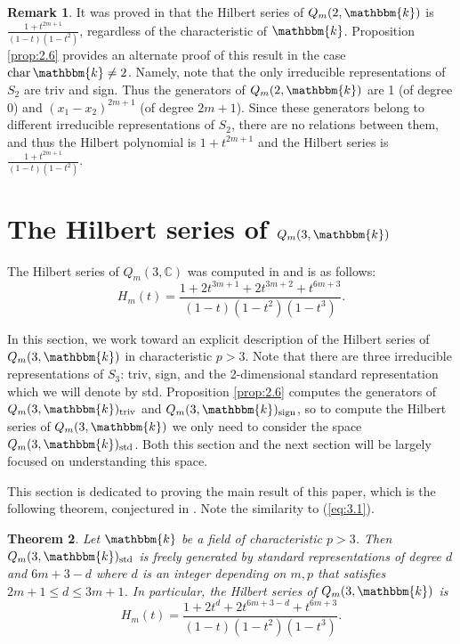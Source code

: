 \documentclass[11pt]{article}
\newtheorem{theorem}{Theorem}[section]
\theoremstyle{definition}
\newtheorem{remark}[theorem]{Remark}
\renewcommand{\k}{\mathbbm{k}}
\newcommand{\triv}{\mathrm{triv}}
\newcommand{\std}{\mathrm{std}}
\newcommand{\sgn}{\mathrm{sign}}
\renewcommand{\char}{\text{char\,}}
\newcommand{\C}{\mathbb{C}}
\begin{document}
\begin{remark}\label{rem:2.7}
    It was proved in \cite{Ren_2020} that the Hilbert series of $Q_m(2,\k)$ is $\frac{1+t^{2m+1}}{(1-t)(1-t^2)}$, regardless of the characteristic of $\k$. Proposition \ref{prop:2.6} provides an alternate proof of this result in the case $\char \k\neq 2$. Namely, note that the only irreducible representations of $S_2$ are triv and sign. Thus the generators of $Q_m(2,\k)$ are 1 (of degree 0) and $(x_1-x_2)^{2m+1}$ (of degree $2m+1$). Since these generators belong to different irreducible representations of $S_2$, there are no relations between them, and thus the Hilbert polynomial is $1+t^{2m+1}$ and the Hilbert series is $\frac{1+t^{2m+1}}{(1-t)(1-t^2)}$.
\end{remark}

\section{The Hilbert series of $Q_m(3,\k)$}\label{sec:3}

The Hilbert series of $Q_m(3,\C)$ was computed in \cite{felder2003action} and is as follows:
\begin{equation}\label{eq:3.1}
    H_m(t)=\frac{1+2t^{3m+1}+2t^{3m+2}+t^{6m+3}}{(1-t)(1-t^2)(1-t^3)}.\tag{3.1}
\end{equation}

In this section, we work toward an explicit description of the Hilbert series of $Q_m(3,\k)$ in characteristic $p>3$. Note that there are three irreducible representations of $S_3$: triv, sign, and the 2-dimensional standard representation which we will denote by std. Proposition \ref{prop:2.6} computes the generators of $Q_m(3,\k)_\triv$ and $Q_m(3,\k)_\sgn$, so to compute the Hilbert series of $Q_m(3,\k)$ we only need to consider the space $Q_m(3,\k)_\std$. Both this section and the next section will be largely focused on understanding this space.

This section is dedicated to proving the main result of this paper, which is the following theorem, conjectured in \cite{Ren_2020}. Note the similarity to (\ref{eq:3.1}).

\begin{theorem}\label{thm:3.1}
    Let $\k$ be a field of characteristic $p>3$. Then $Q_m(3,\k)_\std$ is freely generated by standard representations of degree $d$ and $6m+3-d$ where $d$ is an integer depending on $m,p$ that satisfies $2m+1\leq d\leq 3m+1$. In particular, the Hilbert series of $Q_m(3,\k)$ is
    $$H_m(t)=\frac{1+2t^d+2t^{6m+3-d}+t^{6m+3}}{(1-t)(1-t^2)(1-t^3)}.$$
    
\end{theorem}
\end{document}
